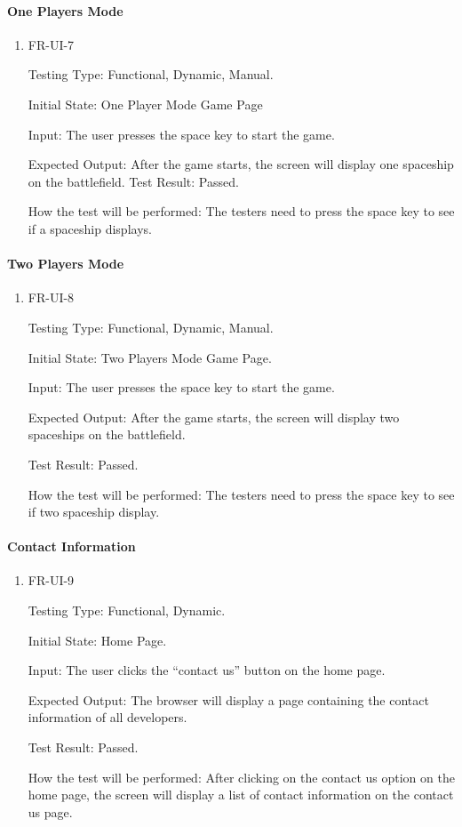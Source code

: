 \documentclass[12pt, titlepage]{article}
\begin{document}
\paragraph{One Players Mode}
\begin{enumerate}					
\item{FR-UI-7\\}

Testing Type: Functional, Dynamic, Manual.  

Initial State: One Player Mode Game Page

Input: The user presses the space key to start the game.

Expected Output: After the game starts, the screen will display one spaceship on the battlefield.
Test Result: Passed.

How the test will be performed: The testers need to press the space key to see if a spaceship displays.
\\
\end{enumerate}

\paragraph{Two Players Mode }
\begin{enumerate}					
\item{FR-UI-8\\}

Testing Type: Functional, Dynamic, Manual.  

Initial State: Two Players Mode Game Page.

Input: The user presses the space key to start the game.

Expected Output: After the game starts, the screen will display two spaceships on the battlefield.

Test Result: Passed.

How the test will be performed: The testers need to press the space key to see if two spaceship display.
\\
\end{enumerate}

\paragraph{Contact Information}
\begin{enumerate}					
\item{FR-UI-9\\}

Testing Type: Functional, Dynamic.  

Initial State: Home Page.

Input: The user clicks the “contact us” button on the home page.

Expected Output: The browser will display a page containing the contact information of all developers.

Test Result: Passed.

How the test will be performed: After clicking on the contact us option on the home page, the screen will display a list of contact information on the contact us page.
\\
\end{enumerate}
\end{document}
